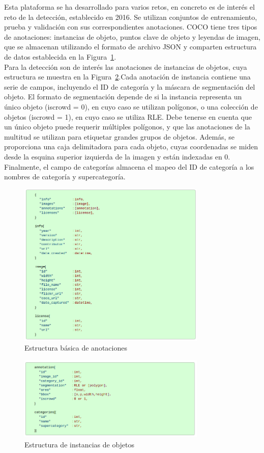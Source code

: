 Esta plataforma se ha desarrollado para varios retos, en concreto es de interés el reto de la detección, establecido en 2016. Se utilizan conjuntos de entrenamiento, prueba y validación con sus correspondientes anotaciones. COCO tiene tres tipos de anotaciones: instancias de objeto, puntos clave de objeto y leyendas de imagen, que se almacenan utilizando el formato de archivo JSON y comparten estructura de datos establecida en la Figura~\ref{fig.basicStruc}. \\

Para la detección son de interés las anotaciones de instancias de objetos, cuya estructura se muestra en la Figura~\ref{fig.objInst}.Cada anotación de instancia contiene una serie de campos, incluyendo el ID de categoría y la máscara de segmentación del objeto. El formato de segmentación depende de si la instancia representa un único objeto (iscrowd = 0), en cuyo caso se utilizan polígonos, o una colección de objetos (iscrowd = 1), en cuyo caso se utiliza RLE. Debe tenerse en cuenta que un único objeto puede requerir múltiples polígonos, y que las anotaciones de la multitud se utilizan para etiquetar grandes grupos de objetos. Además, se proporciona una caja delimitadora para cada objeto, cuyas coordenadas se miden desde la esquina superior izquierda de la imagen y están indexadas en 0. Finalmente, el campo de categorías  almacena el mapeo del ID de categoría a los nombres de categoría y supercategoría.

\begin{figure}[h!]
	\begin{center}
		\includegraphics[width=0.8\textwidth]{figures/basic_structure_annotations.png}
		\caption{Estructura básica de anotaciones}
		\label{fig.basicStruc}
	\end{center}
\end{figure} 

\begin{figure}
	\begin{center}
		\includegraphics[width=0.8\textwidth]{figures/instancia_objetos.png}
		\caption{Estructura de instancias de objetos}
		\label{fig.objInst}
	\end{center}
\end{figure} 


